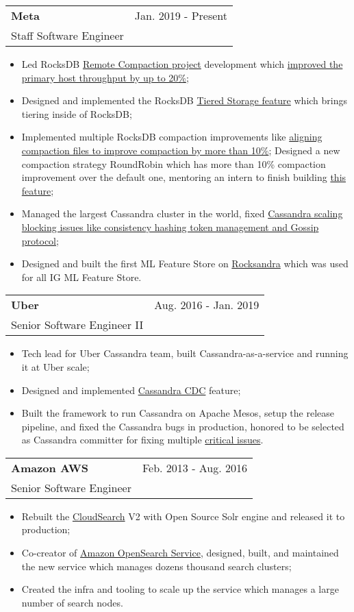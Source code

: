 \documentclass[letterpaper,11pt]{article}
\makeatletter
\newcommand{\resumeItem}[1]{
  \item{
    {#1 \vspace{-2pt}}
  }
}
\newcommand{\resumeSubheading}[4]{
  \vspace{-2pt}\item
    \begin{tabular*}{0.97\textwidth}[t]{l@{\extracolsep{\fill}}r}
      \textbf{\large#1} & {\large#2} \\
      {\large#3} & \textit{\small #4} \\
    \end{tabular*}\vspace{-10pt}
}
\newcommand{\resumeItemListStart}{\begin{itemize}}
\newcommand{\resumeItemListEnd}{\end{itemize}\vspace{-2pt}}
\makeatother
\begin{document}
    \resumeSubheading
      {Meta}{Jan. 2019 - Present}
      {Staff Software Engineer}{}
      \resumeItemListStart
        \small\resumeItem{Led RocksDB \href{https://github.com/facebook/rocksdb/wiki/Remote-Compaction-\%28Experimental\%29}{Remote Compaction project} development which \href{https://drive.google.com/file/d/1PBFwP6VFg-EQemPJaeLwIsZMq5K0kwg7/view?usp=share_link}{improved the primary host throughput by up to 20\%};}
        \resumeItem{Designed and implemented the RocksDB \href{https://github.com/facebook/rocksdb/wiki/Tiered-Storage-\%28Experimental\%29}{Tiered Storage feature} which brings tiering inside of RocksDB;}
        \resumeItem{Implemented multiple RocksDB compaction improvements like \href{https://rocksdb.org/blog/2022/10/31/align-compaction-output-file.html}{aligning compaction files to improve compaction by more than 10\%}; Designed a new compaction strategy RoundRobin which has more than 10\% compaction improvement over the default one, mentoring an intern to finish building \href{https://github.com/facebook/rocksdb/blob/b0d9776b704af01c2b5385e9d53754e0c8176373/include/rocksdb/advanced_options.h\#L58-L62}{this feature};}
        \resumeItem{Managed the largest Cassandra cluster in the world, fixed \href{https://github.com/ngcc/ngcc2019/blob/master/CassandraTokenManagement.pdf}{Cassandra scaling blocking issues like consistency hashing token management and Gossip protocol};}
        \resumeItem{Designed and built the first ML Feature Store on \href{https://github.com/Instagram/cassandra}{Rocksandra} which was used for all IG ML Feature Store.}
        \resumeItemListEnd

    \resumeSubheading
      {Uber}{Aug. 2016 - Jan. 2019}
      {Senior Software Engineer II}{}
      \resumeItemListStart
        \small\resumeItem{Tech lead for Uber Cassandra team, built Cassandra-as-a-service and running it at Uber scale;}
        \resumeItem{Designed and implemented \href{https://github.com/ngcc/ngcc2017/blob/master/CassandraDataIngestion.pdf}{Cassandra CDC} feature;}
        \resumeItem{Built the framework to run Cassandra on Apache Mesos, setup the release pipeline, and fixed the Cassandra bugs in production, honored to be selected as Cassandra committer for fixing multiple \href{https://issues.apache.org/jira/browse/CASSANDRA-15291?jql=assignee\%20\%3D\%20jay.zhuang}{critical issues}.}
        \resumeItemListEnd

    \resumeSubheading
      {Amazon AWS}{Feb. 2013 - Aug. 2016}
      {Senior Software Engineer}{}
      \resumeItemListStart
        \small
        \resumeItem{Rebuilt the \href{https://aws.amazon.com/cloudsearch/}{CloudSearch} V2 with Open Source Solr engine and released it to production;}
        \resumeItem{Co-creator of \href{https://aws.amazon.com/opensearch-service/}{Amazon OpenSearch Service}, designed, built, and maintained the new service which manages dozens thousand search clusters;}
        \resumeItem{Created the infra and tooling to scale up the service which manages a large number of search nodes.}
        \resumeItemListEnd
        
\end{document}
